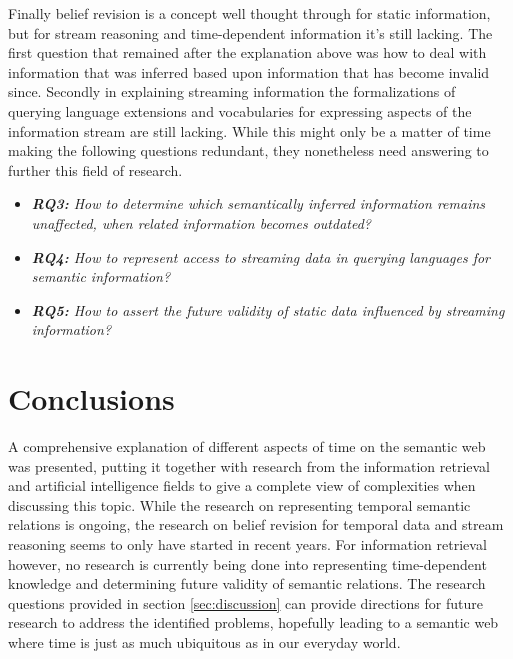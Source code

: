 \documentclass{llncs}
\begin{document}
Finally belief revision is a concept well thought through for static information, but for stream reasoning and time-dependent information it's still lacking. The first question that remained after the explanation above was how to deal with information that was inferred based upon information that has become invalid since. Secondly in explaining streaming information the formalizations of querying language extensions and vocabularies for expressing aspects of the information stream are still lacking. While this might only be a matter of time making the following questions redundant, they nonetheless need answering to further this field of research.
\begin{itemize}
\item \emph{\textbf{RQ3:} How to determine which semantically inferred information remains unaffected, when related information becomes outdated?}
\item \emph{\textbf{RQ4:} How to represent access to streaming data in querying languages for semantic information?}
\item \emph{\textbf{RQ5:} How to assert the future validity of static data influenced by streaming information?}
\end{itemize}


\section{Conclusions}
\label{sec:conclusions}

A comprehensive explanation of different aspects of time on the semantic web was presented, putting it together with research from the information retrieval and artificial intelligence fields to give a complete view of complexities when discussing this topic. While the research on representing temporal semantic relations is ongoing, the research on belief revision for temporal data and stream reasoning seems to only have started in recent years. For information retrieval however, no research is currently being done into representing time-dependent knowledge and determining future validity of semantic relations. The research questions provided in section \ref{sec:discussion} can provide directions for future research to address the identified problems, hopefully leading to a semantic web where time is just as much ubiquitous as in our everyday world.


{}
\end{document}
